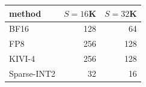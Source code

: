 \begin{tabular}{l r r}
\toprule
method & $S{=}16$K & $S{=}32$K \\
\midrule
BF16 & 128 & 64 \\
FP8 & 256 & 128 \\
KIVI-4 & 256 & 128 \\
Sparse-INT2 & 32 & 16 \\
\bottomrule
\end{tabular}
